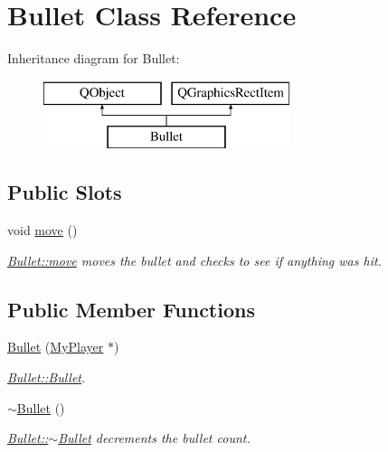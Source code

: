 \hypertarget{class_bullet}{}\section{Bullet Class Reference}
\label{class_bullet}
Inheritance diagram for Bullet\+:\begin{figure}[H]
\begin{center}
\leavevmode
\includegraphics[height=2.000000cm]{class_bullet}
\end{center}
\end{figure}
\subsection*{Public Slots}
\begin{DoxyCompactItemize}
\item 
\hypertarget{class_bullet_a6140db968c42c05e829e142f74f20b16}{}void \hyperlink{class_bullet_a6140db968c42c05e829e142f74f20b16}{move} ()\label{class_bullet_a6140db968c42c05e829e142f74f20b16}

\begin{DoxyCompactList}\small\item\em \hyperlink{class_bullet_a6140db968c42c05e829e142f74f20b16}{Bullet\+::move} moves the bullet and checks to see if anything was hit. \end{DoxyCompactList}\end{DoxyCompactItemize}
\subsection*{Public Member Functions}
\begin{DoxyCompactItemize}
\item 
\hyperlink{class_bullet_a0f8e8b2e3f683cfc930238a7633ce0f2}{Bullet} (\hyperlink{class_my_player}{My\+Player} $\ast$)
\begin{DoxyCompactList}\small\item\em \hyperlink{class_bullet_a0f8e8b2e3f683cfc930238a7633ce0f2}{Bullet\+::\+Bullet}. \end{DoxyCompactList}\item 
\hypertarget{class_bullet_aaeb5cb41d7db89f49007b08b41f1bfcf}{}\hyperlink{class_bullet_aaeb5cb41d7db89f49007b08b41f1bfcf}{$\sim$\+Bullet} ()\label{class_bullet_aaeb5cb41d7db89f49007b08b41f1bfcf}

\begin{DoxyCompactList}\small\item\em \hyperlink{class_bullet_aaeb5cb41d7db89f49007b08b41f1bfcf}{Bullet\+::$\sim$\+Bullet} decrements the bullet count. \end{DoxyCompactList}\end{DoxyCompactItemize}


